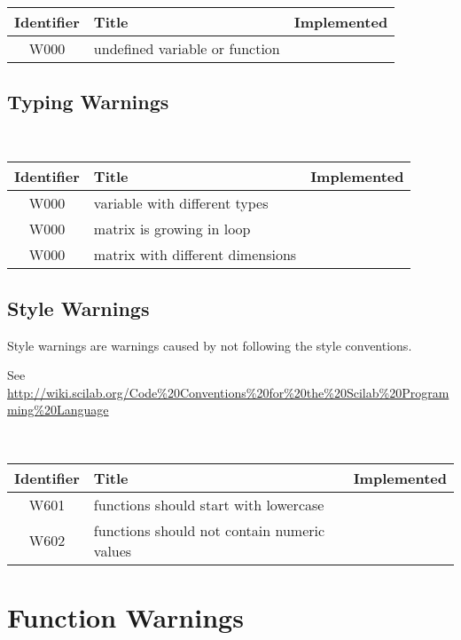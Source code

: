 \noindent\\\begin{tabular}{|c|p{8cm}|c|} \hline
Identifier & Title & Implemented      \\ \hline
W000 & undefined variable or function &  \\ \hline
\end{tabular}

\subsection{Typing Warnings}



\noindent\\\begin{tabular}{|c|p{8cm}|c|} \hline
Identifier & Title & Implemented      \\ \hline
W000 & variable with different types &  \\ \hline
W000 & matrix is growing in loop &  \\ \hline
W000 & matrix with different dimensions &  \\ \hline
\end{tabular}

\subsection{Style Warnings}



Style warnings are warnings caused by not following the style conventions.



See \url{http://wiki.scilab.org/Code%20Conventions%20for%20the%20Scilab%20Programming%20Language}



\noindent\\\begin{tabular}{|c|p{8cm}|c|} \hline
Identifier & Title & Implemented      \\ \hline
W601 & functions should start with lowercase &  \\ \hline
W602 & functions should not contain numeric values &  \\ \hline
\end{tabular}

\section{Function Warnings}



